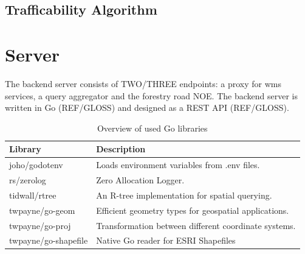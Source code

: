 \subsection{Trafficability Algorithm} %

% 

\section{Server}

The backend server consists of TWO/THREE endpoints: a proxy for \Gls{wms} services, a query aggregator and the forestry road NOE. 
The backend server is written in Go (REF/GLOSS) and designed as a REST API (REF/GLOSS). 

\begin{table}[h]
    \centering
    \begin{tabular}{l|l}
        \hline
        \textbf{Library} & \textbf{Description} \\
        \hline
        joho/godotenv & Loads environment variables from .env files. \\
        rs/zerolog & Zero Allocation Logger. \\
        tidwall/rtree & An R-tree implementation for spatial querying. \\
        twpayne/go-geom & Efficient geometry types for geospatial applications. \\
        twpayne/go-proj & Transformation between different coordinate systems. \\
        twpayne/go-shapefile & Native Go reader for ESRI Shapefiles \\
        \hline
    \end{tabular}
    \caption{Overview of used Go libraries}
    \label{tab:go_libraries}
\end{table}

